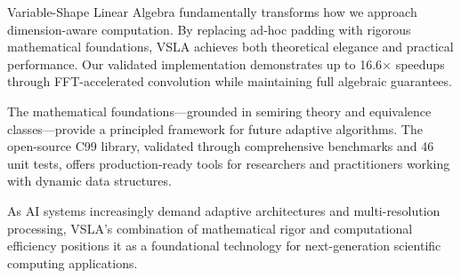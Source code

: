 \documentclass[sigconf,review]{acmart}
\begin{document}
Variable-Shape Linear Algebra fundamentally transforms how we approach dimension-aware computation. By replacing ad-hoc padding with rigorous mathematical foundations, VSLA achieves both theoretical elegance and practical performance. Our validated implementation demonstrates up to 16.6× speedups through FFT-accelerated convolution while maintaining full algebraic guarantees.

The mathematical foundations—grounded in semiring theory and equivalence classes—provide a principled framework for future adaptive algorithms. The open-source C99 library, validated through comprehensive benchmarks and 46 unit tests, offers production-ready tools for researchers and practitioners working with dynamic data structures.

As AI systems increasingly demand adaptive architectures and multi-resolution processing, VSLA's combination of mathematical rigor and computational efficiency positions it as a foundational technology for next-generation scientific computing applications.
\end{document}
